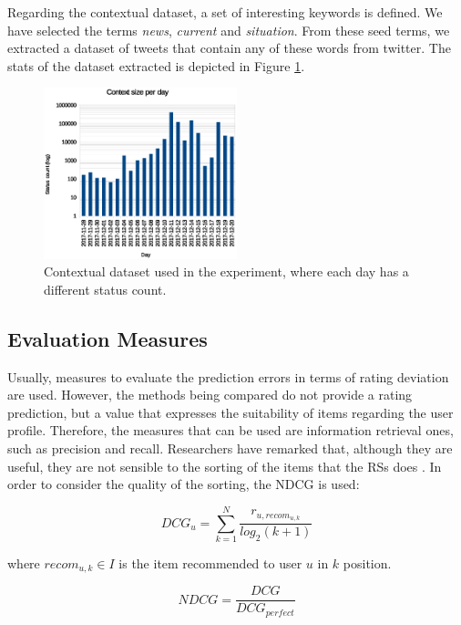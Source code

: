 \documentclass[preprint]{elsarticle}
\begin{document}
\begin{spacing}{1.5}
Regarding the contextual dataset, a set of interesting keywords is defined. We have selected the terms \emph{news}, \emph{current} and \emph{situation}. From these seed terms, we extracted a dataset of tweets that contain any of these words from twitter. The stats of the dataset extracted is depicted in Figure \ref{fig:context-dataset-description}.

\begin{figure}[htb]
    \centering
    \includegraphics[width=0.5\textwidth]{figures/context-dataset-description.eps}
    \caption{Contextual dataset used in the experiment, where each day has a different status count.}
    \label{fig:context-dataset-description}
\end{figure}

\subsection{Evaluation Measures}

Usually, measures to evaluate the prediction errors in terms of rating deviation are used. However, the methods being compared do not provide a rating prediction, but a value that expresses the suitability of items regarding the user profile. Therefore, the measures that can be used are information retrieval ones, such as precision and recall. Researchers have remarked that, although they are useful, they are not sensible to the sorting of the items that the RSs does \cite{Gunawardana2015}. In order to consider the quality of the sorting, the NDCG is used:

\begin{equation}
	DCG_u = \sum_{k=1}^N\frac{r_{u,recom_{u,k}}}{log_2 (k+1)}
\end{equation}

\noindent where $recom_{u,k} \in I$ is the item recommended to user $u$ in $k$ position.

\begin{equation}
	NDCG = \frac{DCG}{DCG_{perfect}}
\end{equation}


\end{spacing}
\end{document}
